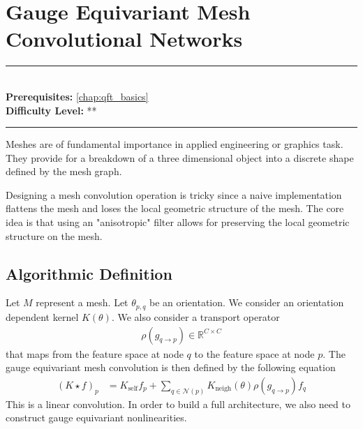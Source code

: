 \documentclass[book.tex]{subfiles}
\begin{document}
\chapter{Gauge Equivariant Mesh Convolutional Networks}

\label{chap:gauge_equivariant_convnet}
\noindent\rule{11cm}{0.4pt} \\
\textbf{Prerequisites:} \autoref{chap:qft_basics}  \\
\textbf{Difficulty Level:} ** \\
\noindent\rule{11cm}{0.4pt}
\vspace{5mm}

Meshes are of fundamental importance in applied engineering or graphics task. They provide for a breakdown of a three dimensional object into a discrete shape defined by the mesh graph. 

Designing a mesh convolution operation is tricky since a naive implementation flattens the mesh and loses the local geometric structure of the mesh. The core idea is that using an "anisotropic" filter allows for preserving the local geometric structure on the mesh.

\section{Algorithmic Definition}

Let $M$ represent a mesh. Let $\theta_{p,q}$ be an orientation. We consider an orientation dependent kernel $K(\theta)$. We also consider a transport operator
\begin{align}
\rho(g_{q \to p}) \in \mathbb{R}^{C \times C}
\end{align}
that maps from the feature space at node $q$ to the feature space at node $p$. The gauge equivariant mesh convolution is then defined by the following equation
\begin{align}
(K \star f)_p &= K_{\textrm{self}} f_p + \sum_{q \in \mathcal{N}(p)} K_{\textrm{neigh}}(\theta) \rho(g_{q \to p}) f_q
\end{align}
This is a linear convolution. In order to build a full architecture, we also need to construct gauge equivariant nonlinearities.
\end{document}
